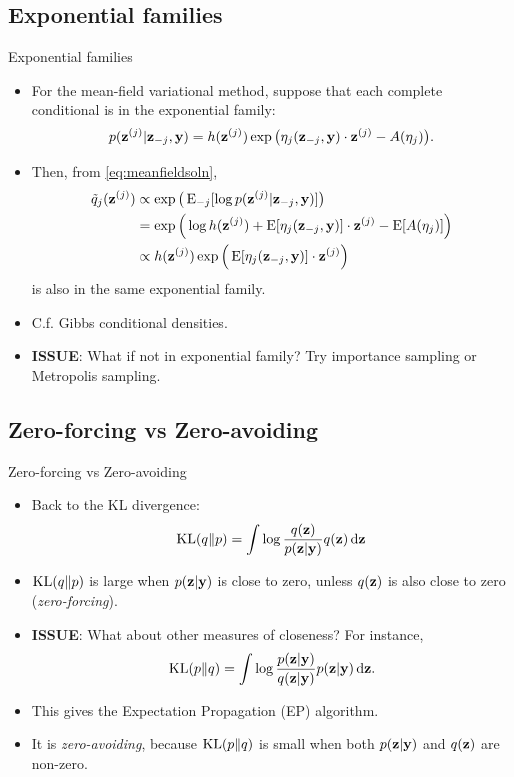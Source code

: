 \subsection{Exponential families}

\begin{frame}{Exponential families}
  \begin{itemize}
    \item For the mean-field variational method, suppose that each complete conditional is in the exponential family:
    \[
      p({\mathbf z}^{(j)}|{\mathbf z}_{-j},{\mathbf y}) = h({\mathbf z}^{(j)})\exp \big(\eta_j({\mathbf z}_{-j},{\mathbf y})\cdot {\mathbf z}^{(j)} - A(\eta_j) \big).
    \]
    \item Then, from \eqref{eq:meanfieldsoln}, 
    \begin{align*}
      \tilde q_j({\mathbf z}^{(j)}) &\propto \exp\big(\operatorname{E}_{-j}[\log p({\mathbf z}^{(j)}|{\mathbf z}_{-j},{\mathbf y})]\big) \\
      &= \exp \Big(\log h({\mathbf z}^{(j)}) + \operatorname{E} [\eta_j({\mathbf z}_{-j},{\mathbf y})] \cdot {\mathbf z}^{(j)} - \operatorname{E} [ A(\eta_j) ] \Big) \\
      &\propto h({\mathbf z}^{(j)})\exp \Big(\operatorname{E} [\eta_j({\mathbf z}_{-j},{\mathbf y})] \cdot {\mathbf z}^{(j)} \Big)
    \end{align*}
    is also in the same exponential family.
    \item C.f. Gibbs conditional densities.
    \item \textbf{ISSUE}: What if not in exponential family? Try importance sampling or Metropolis sampling.
  \end{itemize}
\end{frame}

\subsection{Zero-forcing vs Zero-avoiding}

\begin{frame}{Zero-forcing vs Zero-avoiding}
  \begin{itemize}
    \item Back to the KL divergence:
    \[
      \operatorname{KL}(q \Vert p) = \int \log \frac{q({\mathbf z})}{p({\mathbf z}|{\mathbf y})} q({\mathbf z}) \, \text{d}{\mathbf z}
    \]
    \item $\operatorname{KL}(q \Vert p)$ is large when $p({\mathbf z}|{\mathbf y})$ is close to zero, unless $q({\mathbf z})$ is also close to zero (\emph{zero-forcing}).
    \item \textbf{ISSUE}: What about other measures of closeness? For instance,
    \[
      \operatorname{KL}(p \Vert q) = \int \log \frac{p({\mathbf z}|{\mathbf y})}{q({\mathbf z}|{\mathbf y})} p({\mathbf z}|{\mathbf y}) \, \text{d}{\mathbf z}.
    \]
    \item This gives the Expectation Propagation (EP) algorithm. 
    \item It is \emph{zero-avoiding}, because $\operatorname{KL}(p\Vert q)$ is small when both $p({\mathbf z}|{\mathbf y})$ and $q({\mathbf z})$ are non-zero.
  \end{itemize}
\end{frame}

